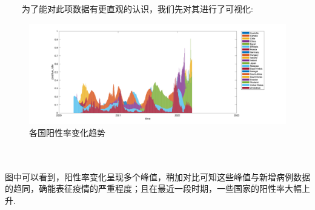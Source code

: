 \documentclass[a4paper, titlepage]{article}
\begin{document}
    　　为了能对此项数据有更直观的认识，我们先对其进行了可视化:\\
    \begin{minipage}{\textwidth}
        \begin{figure}[H]
            \centering
            \includegraphics[width=1.1\textwidth]{./images/PositiveRate_1.png}
            \vspace{-2.5em}
            \caption{各国阳性率变化趋势}
            \label{images:PositiveRate_1}
        \end{figure}
    \end{minipage}\\\quad\\
    图中可以看到，阳性率变化呈现多个峰值，稍加对比可知这些峰值与新增病例数据的趋同，确能表征疫情的严重程度；且在最近一段时期，一些国家的阳性率大幅上升. 
\end{document}
